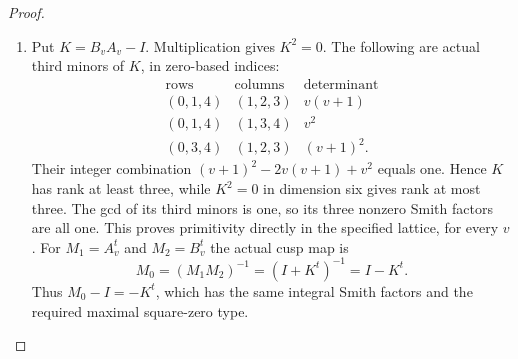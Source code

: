 \begin{proof}
\begin{enumerate}[label=\arabic*.]
The exact unit needed in the hatted lattice is
\[
 z=(-v^3+v-1,0,0,2,2(1-v^2))^t.
\]
Writing $a=-v^3+v-1$, the first coordinate of $Y'z$ is
$-2a-2+2v(1-v^2)=0$. Half its second coordinate is
$(1-v)a+(v^2-v)+q(1-v^2)=0$, since the first two terms
sum to $v^4-v^3+v-1$ and the last is its negative. Furthermore
\[
 \beta z=s(v^3-v-1)+2v^2r=1.
 \tag{F.U5}\label{maps:eq:F.U5}
\]
Indeed the two summands expand to
$v^5+v^4-2v^3-2v^2+1$ and
$-v^5-v^4+2v^3+2v^2$.
Since $AB=I-N$ and $NPz=X(Y'z)=0$, the actual six-dimensional
map satisfies
\[
 (\widehat A\widehat B-I)(0,z)^t=e_0.
\]
This establishes the unit in the displayed hatted coordinates.

The row identity
$\beta(I+B'+B'^2+B'^3)=0$ proves
$\widehat B^4=I$; also $\widehat A^5=I$. Their quotient actions
show that these orders are exact.

Use the specified lattice change
\[
 L=\frac14\begin{pmatrix}
 -2&3&-5&-1&5&-3\\
 0&2&-2&2&-2&2\\
 0&-4&0&0&4&-4\\
 0&0&0&-4&4&-4\\
 0&0&4&-4&4&-4\\
 0&0&0&-4&4&0
 \end{pmatrix},\qquad
 A_v=L^{-1}\widehat A L,\quad B_v=L^{-1}\widehat B L.
 \tag{F.U6}\label{maps:eq:F.U6}
\]
Here $\det L=-1/4$. Expanding these products gives entries in
$\mathbb Z[v]$ for both matrices. The complete expanded entries
and the exact identities
$LA_v=\widehat A L$, $LB_v=\widehat B L$ are supplied by the
polynomial certificate described in the last item. Thus the
defined matrices act on the stated $\mathbb Z^6$ for every integer
parameter. Their determinants are one and their inverses are
the integer powers $A_v^4,B_v^3$. Their characteristic polynomials are
\[
 (x-1)^2\Phi_5(x),\qquad (x-1)^2(x+1)^2(x^2+1),
\]
respectively.

\item Put $K=B_vA_v-I$. Multiplication gives $K^2=0$.
The following are actual third minors of $K$, in zero-based indices:
\[
 \begin{array}{c|c|c}
 \text{rows}&\text{columns}&\text{determinant}\\\hline
 (0,1,4)&(1,2,3)&v(v+1)\\
 (0,1,4)&(1,3,4)&v^2\\
 (0,3,4)&(1,2,3)&(v+1)^2.
 \end{array}
\]
Their integer combination $(v+1)^2-2v(v+1)+v^2$ equals one.
Hence $K$ has rank at least three, while $K^2=0$ in dimension six
gives rank at most three. The gcd of its third minors is one,
so its three nonzero Smith factors are all one. This proves
primitivity directly in the specified lattice, for every $v$.
For $M_1=A_v^t$ and $M_2=B_v^t$ the actual cusp map is
\[
 M_0=(M_1M_2)^{-1}=(I+K^t)^{-1}=I-K^t.
\]
Thus $M_0-I=-K^t$, which has the same integral Smith factors
and the required maximal square-zero type.


\end{enumerate}
\end{proof}
